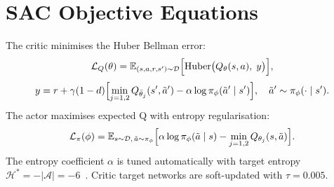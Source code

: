 \documentclass{article}
\newcommand{\Dcal}{\mathcal{D}}
\begin{document}
\clearpage
{}



\appendix
\section{SAC Objective Equations}
\label{app:sac}

The critic minimises the Huber Bellman error:
\begin{equation}
  \mathcal{L}_Q(\theta) = \mathbb{E}_{(s,a,r,s')\sim\Dcal}\Bigl[
    \mathrm{Huber}\bigl(Q_\theta(s,a),\; y\bigr)
  \Bigr],
  \label{eq:critic_loss}
\end{equation}
\begin{equation}
  y = r + \gamma(1-d)\Bigl[
    \min_{j=1,2} Q_{\bar\theta_j}(s', \tilde{a}') - \alpha\log\pi_\phi(\tilde{a}' \mid s')
  \Bigr],
  \quad \tilde{a}' \sim \pi_\phi(\cdot \mid s').
\end{equation}
The actor maximises expected Q with entropy regularisation:
\begin{equation}
  \mathcal{L}_\pi(\phi) = \mathbb{E}_{s\sim\Dcal,\,\tilde{a}\sim\pi_\phi}\Bigl[
    \alpha\log\pi_\phi(\tilde{a} \mid s) - \min_{j=1,2} Q_{\theta_j}(s, \tilde{a})
  \Bigr].
  \label{eq:actor_loss}
\end{equation}
The entropy coefficient $\alpha$ is tuned automatically with target entropy $\mathcal{H}^* = -|\mathcal{A}| = -6$~\citep{haarnoja2018sac}. Critic target networks are soft-updated with $\tau = 0.005$.
\end{document}
